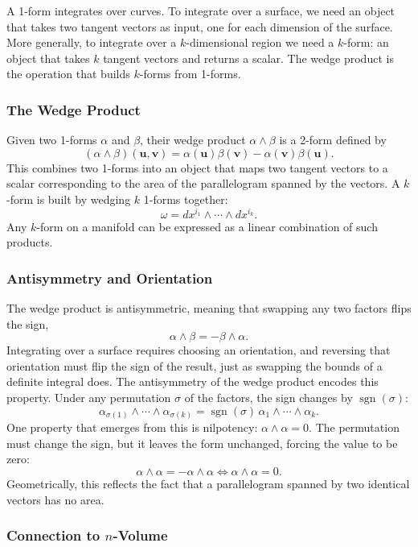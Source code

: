 \documentclass[12pt]{article}
\newcommand{\bv}[1]{\mathbf{#1}}
\begin{document}
A 1-form integrates over curves. To integrate over a surface, we need an object that takes two tangent vectors as input, one for each dimension of the surface. More generally, to integrate over a $k$-dimensional region we need a $k$-form: an object that takes $k$ tangent vectors and returns a scalar. The wedge product is the operation that builds $k$-forms from 1-forms.

\subsubsection{The Wedge Product}

Given two 1-forms $\alpha$ and $\beta$, their wedge product $\alpha \wedge \beta$ is a 2-form defined by
\[
(\alpha \wedge \beta)(\bv{u}, \bv{v}) = \alpha(\bv{u})\beta(\bv{v}) - \alpha(\bv{v})\beta(\bv{u}).
\]
This combines two 1-forms into an object that maps two tangent vectors to a scalar corresponding to the area of the parallelogram spanned by the vectors. A $k$-form is built by wedging $k$ 1-forms together:
\[
\omega = dx^{i_1} \wedge \cdots \wedge dx^{i_k}.
\]
Any $k$-form on a manifold can be expressed as a linear combination of such products.

\subsubsection{Antisymmetry and Orientation}

The wedge product is antisymmetric, meaning that swapping any two factors flips the sign,
\[
\alpha \wedge \beta = -\beta \wedge \alpha.
\]
Integrating over a surface requires choosing an orientation, and reversing that orientation must flip the sign of the result, just as swapping the bounds of a definite integral does. The antisymmetry of the wedge product encodes this property. Under any permutation $\sigma$ of the factors, the sign changes by $\operatorname{sgn}(\sigma)$:
\[
\alpha_{\sigma(1)} \wedge \cdots \wedge \alpha_{\sigma(k)} = \operatorname{sgn}(\sigma)\, \alpha_1 \wedge \cdots \wedge \alpha_k.
\]
One property that emerges from this is nilpotency: $\alpha \wedge \alpha = 0$. The permutation must change the sign, but it leaves the form unchanged, forcing the value to be zero:
\[
\alpha \wedge \alpha = - \alpha \wedge \alpha \iff \alpha \wedge \alpha = 0.
\]
 Geometrically, this reflects the fact that a parallelogram spanned by two identical vectors has no area.

\subsubsection{Connection to $n$-Volume}
\end{document}
